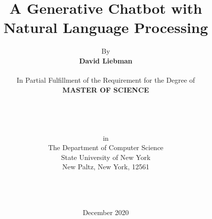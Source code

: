 \documentclass[notitlepage]{report}
\begin{document}

\title{\textbf{A Generative Chatbot with Natural Language Processing } 
}



\author{By \\ \textbf{David Liebman } \\ \\
In Partial Fulfillment of the Requirement for the Degree of \\
\textbf{MASTER OF SCIENCE } \\ \\ \\ \\ \\


in \\
The Department of Computer Science \\
State University of New York \\ 
New Paltz, New York, 12561 \\ \\ \\ \\

\vspace{3cm}
}
\date{December 2020
}
\maketitle		
		



\newpage
\end{document}

